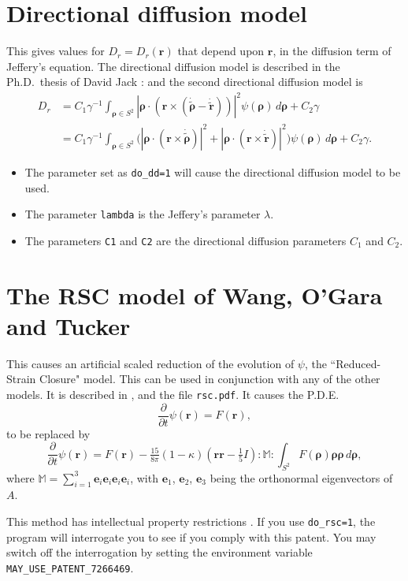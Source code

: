 \documentclass{amsart}
\newcommand{\br}{{\mathbf r}}
\newcommand{\e}{{\mathbf e}}
\newcommand{\brho}{{\boldsymbol \rho}}
\begin{document}
\section*{Directional diffusion model}

\noindent
This gives values for $D_r=D_r(\br)$ that depend upon $\br$, in the diffusion term of Jeffery's equation.  The directional diffusion model is described in the Ph.D.\ thesis of David Jack \cite{jack}:
and the second directional diffusion model is
\begin{align*}
D_r &= C_1 \gamma^{-1} \int_{\brho \in S^2} |\brho\cdot(\br\times(\dot{\tilde\brho}-\dot{\tilde \br}))|^2 \psi(\brho) \, d\brho +
C_2 \gamma \\
&= C_1 \gamma^{-1} \int_{\brho \in S^2} \bigl(|\brho\cdot(\br\times\dot{\tilde\brho})|^2 + |\brho\cdot(\br\times\dot{\tilde\br})|^2\bigr) \psi(\brho) \, d\brho +
C_2 \gamma .
\end{align*}
\begin{itemize}
\item The parameter set as {\tt do\_dd=1} will cause the directional diffusion model to be used.
\item The parameter {\tt lambda} is the Jeffery's parameter $\lambda$.
\item The parameters {\tt C1} and {\tt C2} are the directional diffusion parameters $C_1$ and $C_2$.
\end{itemize}

\section*{The RSC model of Wang, O'Gara and Tucker}

\noindent
This causes an artificial scaled reduction of the evolution of $\psi$, the ``Reduced-Strain Closure" model.  This can be used in conjunction with any of the other models.  It is described in \cite{rsc}, and the file {\tt rsc.pdf}.  It causes the P.D.E.\ 
$$ \frac{\partial}{\partial t}\psi(\br) = F(\br),$$
to be replaced by
$$ \frac{\partial}{\partial t}\psi(\br) = F(\br) - \tfrac{15}{8\pi}(1-\kappa)(\br\br-\tfrac15 I):\mathbb M:\int_{S^2} F(\brho) \brho\brho \, d\brho,$$
where $\mathbb M = \sum_{i=1}^3 \e_i\e_i\e_i\e_i$, with $\e_1$, $\e_2$, $\e_3$ being the orthonormal eigenvectors of $A$.

This method has intellectual property restrictions \cite{rsc-pat}.  If you use {\tt do\_rsc=1}, the program will interrogate you to see if you comply with this patent.  You may switch off the interrogation by setting the environment variable {\tt MAY\_USE\_PATENT\_7266469}.
\end{document}
